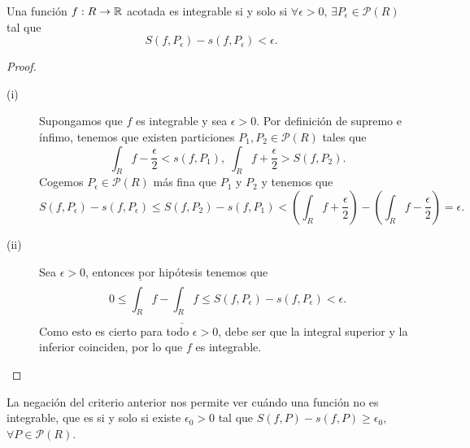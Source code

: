 \begin{theorem}
Una función $\displaystyle f: R \to \mathbb{R} $ acotada es integrable si y solo si $\displaystyle \forall \epsilon > 0 $, $\displaystyle \exists P_{\epsilon } \in \mathcal{P}\left(R\right) $ tal que 
\[S\left(f,P_{\epsilon }\right)-s\left(f,P_{\epsilon }\right) < \epsilon  .\]
\end{theorem}
\begin{proof}
\begin{description}
\item[(i)] Supongamos que $\displaystyle f $ es integrable y sea $\displaystyle \epsilon > 0 $. Por definición de supremo e ínfimo, tenemos que existen particiones $\displaystyle P_{1}, P_{2} \in \mathcal{P}\left(R\right) $ tales que
	\[\int _{R}f -\frac{\epsilon }{2} < s\left(f, P_{1}\right), \; \int _{R}f +\frac{\epsilon }{2} > S\left(f,P_{2}\right) .\]
Cogemos $\displaystyle P_{\epsilon} \in \mathcal{P}\left(R\right) $ más fina que $\displaystyle P_{1} $ y $\displaystyle P_{2} $ y tenemos que
\[S\left(f,P_{\epsilon}\right)-s\left(f,P_{\epsilon}\right) \leq S\left(f,P_{2}\right)-s\left(f,P_{1}\right)<\left(\int _{R}f +\frac{\epsilon }{2}\right)-\left(\int _{R}f -\frac{\epsilon }{2}\right) = \epsilon  .\]
\item[(ii)] Sea $\displaystyle \epsilon > 0 $, entonces por hipótesis tenemos que
	\[0 \leq \overline{\int _{R}}f-\underline{\int _{R}}f \leq S\left(f,P_{\epsilon }\right)-s\left(f,P_{\epsilon }\right) < \epsilon .\]
	Como esto es cierto para todo $\displaystyle \epsilon > 0 $, debe ser que la integral superior y la inferior coinciden, por lo que $\displaystyle f $ es integrable. 
\end{description}
\end{proof}
\begin{observation}
La negación del criterio anterior nos permite ver cuándo una función no es integrable, que es si y solo si existe $\displaystyle \epsilon _{0} > 0 $ tal que $\displaystyle S\left(f, P\right)-s\left(f,P\right) \geq \epsilon_{0} $, $\displaystyle \forall P \in \mathcal{P}\left(R\right) $. 
\end{observation}
